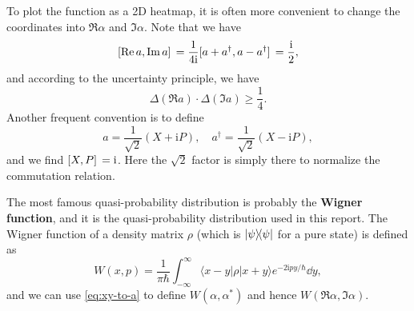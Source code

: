 \documentclass[hyperref, a4paper]{article}
\newcommand*{\ii}{\mathrm{i}}
\newcommand*{\concept}[1]{{\textbf{#1}}}
\begin{document}
To plot the function as a 2D heatmap,
it is often more convenient to change the coordinates into $\Re \alpha$ and $\Im \alpha$.
Note that we have 
\begin{equation}
    \comm*{\Re a}{\Im a} = \frac{1}{4 \ii} \comm*{a + a^\dagger}{a - a^\dagger}
    = \frac{\ii}{2},
\end{equation}
and according to the uncertainty principle, we have 
\begin{equation}
    \Delta (\Re a) \cdot \Delta (\Im a) \geq \frac{1}{4}.
    \label{eq:re-im-fluctuation}
\end{equation}
Another frequent convention is to define 
\begin{equation}
    a = \frac{1}{\sqrt{2}} (X + \ii P), \quad 
    a^\dagger = \frac{1}{\sqrt{2}} (X - \ii P),
    \label{eq:xy-to-a}
\end{equation}
and we find $\comm*{X}{P} = \ii$.
Here the $\sqrt{2}$ factor is simply there to normalize the commutation relation.

The most famous quasi-probability distribution is probably the \concept{Wigner function},
and it is the quasi-probability distribution used in this report.
The Wigner function of a density matrix $\rho$ (which is $\dyad{\psi}$ for a pure state) 
is defined as \cite{scully1999quantum}
\begin{equation}
    W(x, p)=\frac{1}{\pi \hbar} \int_{-\infty}^{\infty}\langle x-y|{\rho}| x+y\rangle e^{-2 \ii p y / \hbar} \dd y,
\end{equation}
and we can use \eqref{eq:xy-to-a} to define $W(\alpha, \alpha^*)$ and hence $W(\Re \alpha, \Im \alpha)$.
\end{document}
